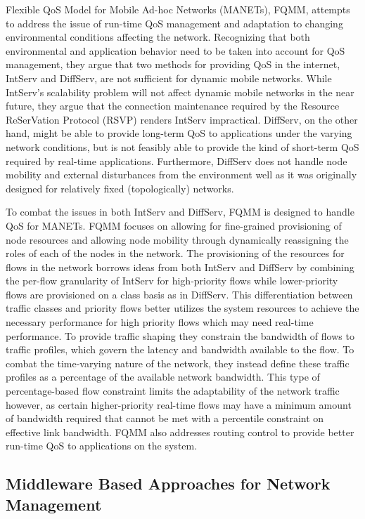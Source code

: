 Flexible QoS Model for Mobile Ad-hoc Networks (MANETs),
FQMM\cite{Xiao2000}, attempts to address the issue of run-time QoS
management and adaptation to changing environmental conditions
affecting the network.  Recognizing that both environmental and
application behavior need to be taken into account for QoS management,
they argue that two methods for providing QoS in the internet, IntServ
and DiffServ, are not sufficient for dynamic mobile networks.  While
IntServ's scalability problem will not affect dynamic mobile networks
in the near future, they argue that the connection maintenance
required by the Resource ReSerVation Protocol (RSVP) renders IntServ
impractical.  DiffServ, on the other hand, might be able to provide
long-term QoS to applications under the varying network conditions,
but is not feasibly able to provide the kind of short-term QoS
required by real-time applications.  Furthermore, DiffServ does not
handle node mobility and external disturbances from the environment
well as it was originally designed for relatively fixed
(topologically) networks.

To combat the issues in both IntServ and DiffServ, FQMM is designed to
handle QoS for MANETs.  FQMM focuses on allowing for fine-grained
provisioning of node resources and allowing node mobility through
dynamically reassigning the roles of each of the nodes in the network.
The provisioning of the resources for flows in the network borrows
ideas from both IntServ and DiffServ by combining the per-flow
granularity of IntServ for high-priority flows while lower-priority
flows are provisioned on a class basis as in DiffServ.  This
differentiation between traffic classes and priority flows better
utilizes the system resources to achieve the necessary performance for
high priority flows which may need real-time performance.  To provide
traffic shaping they constrain the bandwidth of flows to traffic
profiles, which govern the latency and bandwidth available to the
flow. To combat the time-varying nature of the network, they instead
define these traffic profiles as a percentage of the available network
bandwidth.  This type of percentage-based flow constraint limits the
adaptability of the network traffic however, as certain
higher-priority real-time flows may have a minimum amount of bandwidth
required that cannot be met with a percentile constraint on effective
link bandwidth.  FQMM also addresses routing control to provide better
run-time QoS to applications on the system.

\subsection{Middleware Based Approaches for Network Management}
\label{subsec:related_part2_middleware}

